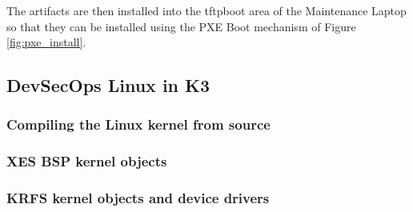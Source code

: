 \documentclass[12pt]{article}
\begin{document}
\begin{table}[H]
    \captionsetup{width=0.9\linewidth}
    \caption{Artifacts created with RedHawk Architect}
    \label{tab:architect_artifacts}
\end{table}

The artifacts are then installed into the tftpboot area of the Maintenance
Laptop so that they can be installed using the PXE Boot mechanism of Figure
\ref{fig:pxe_install}.


%
\subsection{DevSecOps Linux in K3}

\subsubsection{Compiling the Linux kernel from source}

\subsubsection{XES BSP kernel objects}

\subsubsection{KRFS kernel objects and device drivers}
\end{document}
